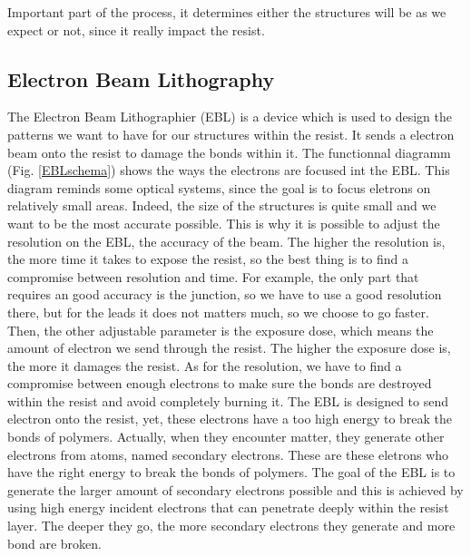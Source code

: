         Important part of the process, it determines either the structures will be as we expect or not, since it really impact the resist.
        
        \subsection{Electron Beam Lithography}
            The Electron Beam Lithographier (EBL) is a device which is used to design the patterns we want to have for our structures within the resist\cite{EBL_theory}. It sends a electron beam onto the resist to damage the bonds within it. The functionnal diagramm (Fig. \ref{EBLschema}) shows the ways the electrons are focused int the EBL. This diagram reminds some optical systems, since the goal is to focus eletrons on relatively small areas. Indeed, the size of the structures is quite small and we want to be the most accurate possible. This is why it is possible to adjust the resolution on the EBL, the accuracy of the beam. The higher the resolution is, the more time it takes to expose the resist, so the best thing is to find a compromise between resolution and time. For example, the only part that requires an good accuracy is the junction, so we have to use a good resolution there, but for the leads it does not matters much, so we choose to go faster. Then, the other adjustable parameter is the exposure dose, which means the amount of electron we send through the resist. The higher the exposure dose is, the more it damages the resist. As for the resolution, we have to find a compromise between enough electrons to make sure the bonds are destroyed within the resist and avoid completely burning it. 
            The EBL is designed to send electron onto the resist, yet, these electrons have a too high energy to break the bonds of polymers. Actually, when they encounter matter, they generate other electrons from atoms, named secondary electrons. These are these eletrons who have the right energy to break the bonds of polymers. The goal of the EBL is to generate the larger amount of secondary electrons possible and this is achieved by using high energy incident electrons that can penetrate deeply within the resist layer. The deeper they go, the more secondary electrons they generate and more bond are broken.

            \label{explicationebl}
            
